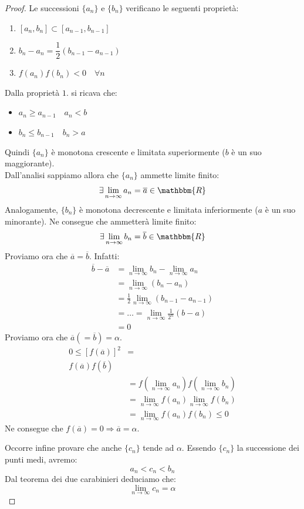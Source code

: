 \documentclass[12pt]{report}
\begin{document}
\begin{proof}
	Le successioni $\{a_n\}$ e $\{b_n\}$ verificano le seguenti proprietà:
	\begin{enumerate}
		\item $[a_n, b_n] \subset [a_{n-1}, b_{n-1}]$
		\item $b_n - a_n = \dfrac{1}{2}(b_{n-1}  - a_{n-1})$
		\item $f(a_n)f(b_n) < 0 \quad \forall n$
	\end{enumerate}
	Dalla proprietà $1.$ si ricava che:
	\begin{itemize}
		\item $a_n \geq a_{n-1} \quad a_n < b$
		\item $b_n \leq b_{n-1} \quad b_n > a$
	\end{itemize}
	Quindi $\{a_n\}$ è monotona crescente e limitata superiormente ($b$ è un suo maggiorante). \\
	Dall'analisi sappiamo allora che $\{a_n\}$ ammette limite finito:
	\[
	\exists \lim\limits_{n \to \infty} a_n = \overline{a} \in \mathbbm{R}
	\]
	Analogamente, $\{b_n\}$ è monotona decrescente e limitata inferiormente ($a$ è un suo minorante). Ne consegue che ammetterà limite finito:
	\[
	\exists \lim\limits_{n \to \infty} b_n = \overline{b} \in \mathbbm{R}
	\]
	Proviamo ora che $\overline{a} = \overline{b}$. Infatti:
	\begin{align*}
		\overline{b} - \overline{a} &= \lim\limits_{n\to\infty}b_n - \lim\limits_{n\to\infty}a_n \\
		&= \lim\limits_{n\to\infty}(b_n - a_n) \\
		&= \frac{1}{2}\lim\limits_{n\to\infty}(b_{n-1} - a_{n-1}) \\
		&= \dots = \lim\limits_{n\to\infty}\frac{1}{2^{n}}(b-a) \\
		&= 0
	\end{align*}
	Proviamo ora che $\overline{a} (= \overline{b}) = \alpha$.
	\begin{align*}
		0 \leq [f(\overline{a})]^2 &= \\
		f(\overline{a})f(\overline{b}) \\
		&= f(\lim\limits_{n\to\infty}a_n) f(\lim\limits_{n\to\infty}b_n) \\
		&= \lim\limits_{n\to\infty}f(a_n) \lim\limits_{n\to\infty}f(b_n) \\
		&= \lim\limits_{n\to\infty}f(a_n)f(b_n) \leq 0
	\end{align*}
	Ne consegue che $f(\overline{a}) = 0 \Rightarrow \overline{a} = \alpha$.

	Occorre infine provare che anche $\{c_n\}$ tende ad $\alpha$. Essendo $\{c_n\}$ la successione dei punti medi, avremo:
	\[
	a_n < c_n < b_n
	\]
	Dal teorema dei due carabinieri deduciamo che:
	\[
	\lim\limits_{n\to\infty}c_n = \alpha
	\]
\end{proof}
\end{document}
